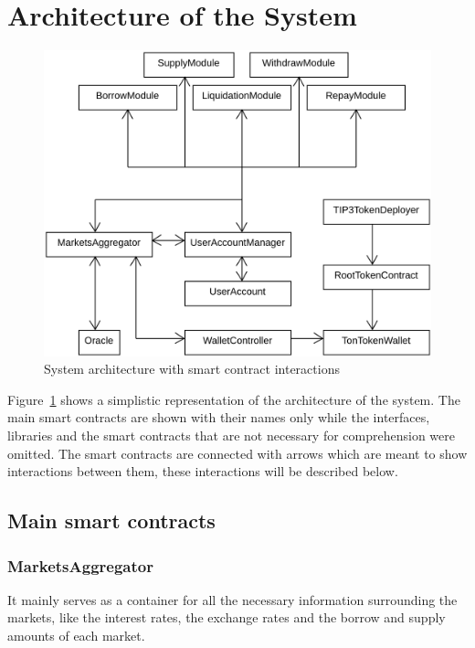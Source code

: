 \section{Architecture of the System}

\begin{figure}[h!]
  \includegraphics[width=\textwidth]{./assets/archi.png}
  \caption{System architecture with smart contract interactions}
  \label{fig:archi}
  \captionsetup[figure]{list=no} %
\end{figure}

Figure~\ref{fig:archi} shows a simplistic representation of the architecture of the system. The main smart contracts are shown with their names only while the interfaces, libraries and the smart contracts that are not necessary for comprehension were omitted. The smart contracts are connected with arrows which are meant to show interactions between them, these interactions will be described below.

\subsection{Main smart contracts}

\subsubsection{MarketsAggregator}

It mainly serves as a container for all the necessary information surrounding the markets, like the interest rates, the exchange rates and the borrow and supply amounts of each market.

